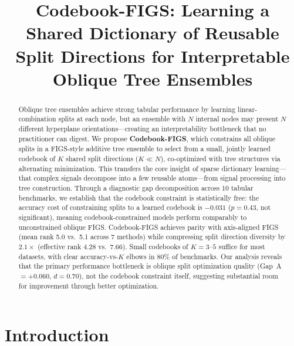 \documentclass[11pt,letterpaper]{article}
\title{Codebook-FIGS: Learning a Shared Dictionary of Reusable Split Directions for Interpretable Oblique Tree Ensembles}
\author{}
\date{}
\begin{document}
\maketitle

\begin{abstract}
Oblique tree ensembles achieve strong tabular performance by learning linear-combination splits at each node, but an ensemble with $N$ internal nodes may present $N$ different hyperplane orientations---creating an interpretability bottleneck that no practitioner can digest.
We propose \textbf{Codebook-FIGS}, which constrains all oblique splits in a FIGS-style additive tree ensemble to select from a small, jointly learned codebook of $K$ shared split directions ($K \ll N$), co-optimized with tree structures via alternating minimization.
This transfers the core insight of sparse dictionary learning---that complex signals decompose into a few reusable atoms---from signal processing into tree construction.
Through a diagnostic gap decomposition across 10 tabular benchmarks, we establish that the codebook constraint is statistically free: the accuracy cost of constraining splits to a learned codebook is $-0.031$ ($p = 0.43$, not significant), meaning codebook-constrained models perform comparably to unconstrained oblique FIGS.
Codebook-FIGS achieves parity with axis-aligned FIGS (mean rank 5.0 vs.\ 5.1 across 7 methods) while compressing split direction diversity by $2.1\times$ (effective rank 4.28 vs.\ 7.66).
Small codebooks of $K = 3$--$5$ suffice for most datasets, with clear accuracy-vs-$K$ elbows in 80\% of benchmarks.
Our analysis reveals that the primary performance bottleneck is oblique split optimization quality (Gap~A $ = +0.060$, $d = 0.70$), not the codebook constraint itself, suggesting substantial room for improvement through better optimization.
\end{abstract}

\section{Introduction}
\end{document}
